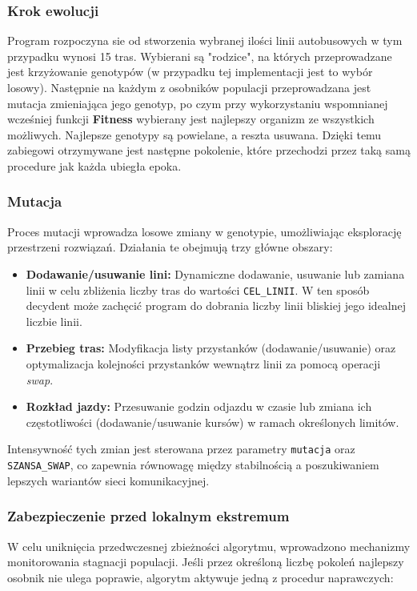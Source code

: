 \subsubsection{Krok ewolucji}
Program rozpoczyna sie od stworzenia wybranej ilości linii autobusowych w tym przypadku wynosi 15 tras. Wybierani są "rodzice", na których przeprowadzane jest krzyżowanie genotypów (w przypadku tej implementacji jest to wybór losowy). Następnie na każdym z osobników populacji przeprowadzana jest mutacja zmieniająca jego genotyp, po czym przy wykorzystaniu wspomnianej wcześniej funkcji \textbf{Fitness} wybierany jest najlepszy organizm ze wszystkich możliwych.
Najlepsze genotypy są powielane, a reszta usuwana.
Dzięki temu zabiegowi otrzymywane jest następne pokolenie, które przechodzi przez taką samą procedure jak każda ubiegła epoka.
\subsubsection{Mutacja}
Proces mutacji wprowadza losowe zmiany w genotypie, umożliwiając eksplorację przestrzeni rozwiązań. Działania te obejmują trzy główne obszary:

\begin{itemize}
    \item \textbf{Dodawanie/usuwanie lini:} Dynamiczne dodawanie, usuwanie lub zamiana linii w celu zbliżenia liczby tras do wartości \texttt{CEL\_LINII}. W ten sposób decydent może zachęcić program do dobrania liczby linii bliskiej jego idealnej liczbie linii.
    \item \textbf{Przebieg tras:} Modyfikacja listy przystanków (dodawanie/usuwanie) oraz optymalizacja kolejności przystanków wewnątrz linii za pomocą operacji \textit{swap}.
    \item \textbf{Rozkład jazdy:} Przesuwanie godzin odjazdu w czasie lub zmiana ich częstotliwości (dodawanie/usuwanie kursów) w ramach określonych limitów.
\end{itemize}

Intensywność tych zmian jest sterowana przez parametry \texttt{mutacja} oraz \texttt{SZANSA\_SWAP}, co zapewnia równowagę między stabilnością a poszukiwaniem lepszych wariantów sieci komunikacyjnej.

\subsubsection{Zabezpieczenie przed lokalnym ekstremum}
W celu uniknięcia przedwczesnej zbieżności algorytmu, wprowadzono mechanizmy monitorowania stagnacji populacji. Jeśli przez określoną liczbę pokoleń najlepszy osobnik nie ulega poprawie, algorytm aktywuje jedną z procedur naprawczych:


